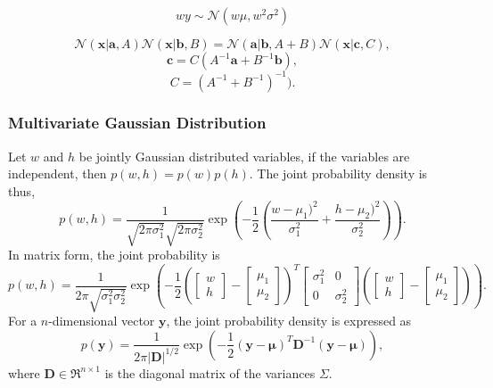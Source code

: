 \documentclass[ %
author={Dillon Keith Diep},
supervisor={Dr. Carl Henrik Ek},
degree={MEng},
title={ART-CG:},
subtitle={Assisted Real-time Content Generation of 3D Hair by Learning Manifolds},
type={Research},
year={2017} ]{dissertation}
\begin{document}
\begin{equation} \label{gd:scale}
wy\sim\mathcal{N}(w\mu,w^2\sigma^2)
\end{equation}

\begin{equation} \label{gd:prod}
\mathcal{N}(\bm{x|a},A)\mathcal{N}(\bm{x|b},B) = \mathcal{N}(\bm{a|b},A+B)\mathcal{N}(\bm{x}|\bm{c}, C),
\end{equation}
$$\bm{c}=C(A^{-1}\bm{a}+B^{-1}\bm{b}),$$
$$C = (A^{-1}+B^{-1})^{-1}).$$


\subsubsection{Multivariate Gaussian Distribution}
\noindent
Let $w$ and $h$ be jointly Gaussian distributed variables, if the variables are independent, then $p(w,h)=p(w)p(h)$.
The joint probability density is thus,
$$p(w,h)=\frac{1}{\sqrt{2\pi\sigma^2_1}\sqrt{2\pi\sigma^2_2}}\exp\left(-\frac{1}{2}\left(\frac{w-\mu_1)^2}{\sigma^2_1}+\frac{h-\mu_2)^2}{\sigma^2_2}\right)\right).$$
In matrix form, the joint probability is
$$p(w,h)=\frac{1}{2\pi\sqrt{\sigma^2_1\sigma^2_2}}\exp
\left(
-\frac{1}{2}
\left(
\left[
\begin{matrix}
w \\
h
\end{matrix}
\right]
-
\left[
\begin{matrix}
\mu_1 \\
\mu_2
\end{matrix}
\right]
\right)^T
\left[
\begin{matrix}
\sigma^2_1  &   0\\
0           &   \sigma^2_2
\end{matrix}
\right]
\left(
\left[
\begin{matrix}
w \\
h
\end{matrix}
\right]
-
\left[
\begin{matrix}
\mu_1 \\
\mu_2
\end{matrix}
\right]
\right)
\right).$$
For a $n$-dimensional vector $\bm{y}$, the joint probability density is expressed as
\begin{equation} \label{jointpd}
p(\bm{y})=\frac{1}{2\pi|\bm{D}|^{1/2}}\exp\left(-\frac{1}{2}(\bm{y}-\bm{\mu})^T\bm{D}^{-1}(\bm{y}-\bm{\mu})\right),
\end{equation}
where $\bm{D}\in\Re^{n \times 1}$ is the diagonal matrix of the variances $\Sigma$. \cite[p.78]{bishop}
\end{document}
